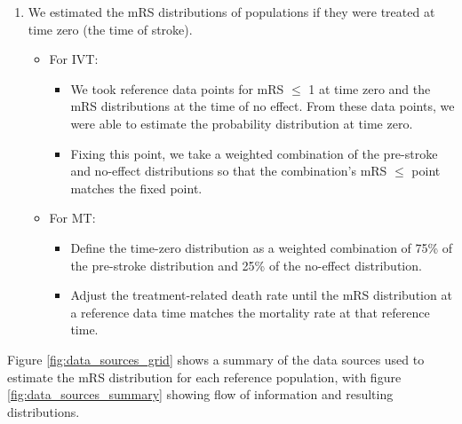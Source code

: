 \begin{enumerate}
\begin{itemize}
    \end{itemize}
    \item We estimated the mRS distributions of populations if they were treated at time zero (the time of stroke).
    \begin{itemize}
        \item For IVT:
        \begin{itemize}
            \item We took reference data points for mRS $\leq$ 1 at time zero and the mRS distributions at the time of no effect. From these data points, we were able to estimate the probability distribution at time zero.
            \item Fixing this point, we take a weighted combination of the pre-stroke and no-effect distributions so that the combination's mRS $\leq$ point matches the fixed point.
        \end{itemize}     
    \end{itemize}
    \begin{itemize}
        \item For MT:
        \begin{itemize}
            \item Define the time-zero distribution as a weighted combination of 75\% of the pre-stroke distribution and 25\% of the no-effect distribution.
            \item Adjust the treatment-related death rate until the mRS distribution at a reference data time matches the mortality rate at that reference time. 
        \end{itemize}
    \end{itemize}    
\end{enumerate}

Figure \ref{fig:data_sources_grid} shows a summary of the data sources used to estimate the mRS distribution for each reference population, with figure \ref{fig:data_sources_summary} showing flow of information and resulting distributions.

